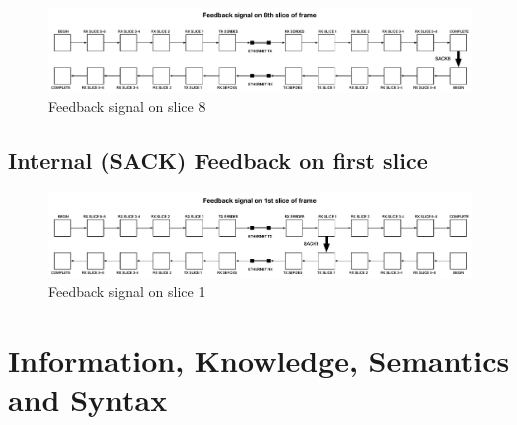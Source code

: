 \documentclass[../HFT-main.tex]{subfiles}
\begin{document}
\begin{figure}
\includegraphics[width=\textwidth]{../figures/feedback-slice-8.pdf}
  \caption{Feedback signal on slice 8}
\end{figure}

\subsection{Internal (SACK) Feedback on first slice}


\begin{figure}
\includegraphics[width=\textwidth]{../figures/Feedback-slice-1.pdf}
  \caption{Feedback signal on slice 1}
\end{figure}

\newpage
\section{Information, Knowledge, Semantics and Syntax}
\end{document}
